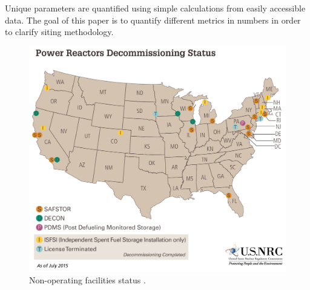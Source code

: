 Unique parameters are quantified using simple calculations from easily accessible
data. The goal of this paper is to quantify different metrics in numbers in order
to clarify siting methodology.

\begin{figure}[!h] 
  \centering
  \includegraphics[width=0.8\columnwidth]{power-reactors-decommissioning}	
  \caption{Non-operating facilities status
  \cite{nuclear_regulatory_commission_nrc_2015}.}
  \label{fig:shutdown}
\end{figure}


